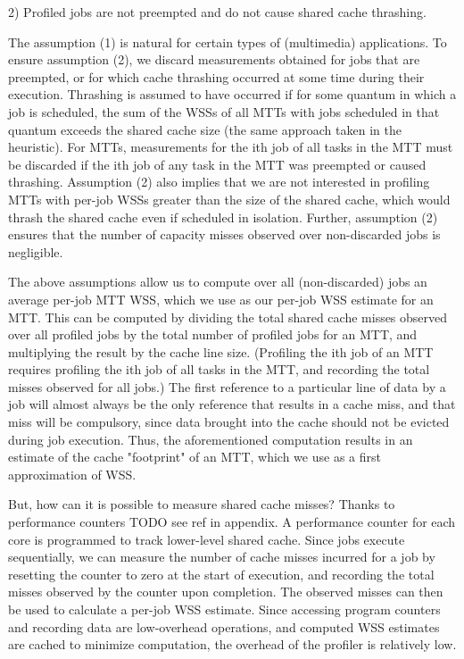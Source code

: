 \documentclass[a4paper,10pt]{article}
\begin{document}
\begin{multicols}{2}
2) Profiled jobs are not preempted and do not cause shared cache thrashing.

The assumption (1) is natural for certain types of (multimedia) applications. To ensure assumption (2), we discard measurements obtained for jobs that
are preempted, or for which cache thrashing occurred at some time during their execution. Thrashing is assumed to have occurred if for some
quantum in which a job is scheduled, the sum of the WSSs of all MTTs with jobs scheduled in that quantum exceeds the
shared cache size (the same approach taken in the heuristic). For MTTs, measurements for the ith job of all tasks in the
MTT must be discarded if the ith job of any task in the MTT was preempted or caused thrashing. Assumption (2) also implies that we are not interested
in profiling MTTs with per-job WSSs greater than the size of the shared cache, which would thrash the shared cache even if scheduled in isolation.
Further, assumption (2) ensures that the number of capacity misses observed over non-discarded jobs is negligible.

The above assumptions allow us to compute over all (non-discarded) jobs an average per-job MTT WSS, which we use as our per-job WSS estimate for
an MTT. This can be computed by dividing the total shared cache misses observed over all profiled jobs by the total number of profiled jobs for an MTT, 
and multiplying the result by the cache line size. (Profiling the ith job of an MTT requires profiling the ith job of all tasks in the MTT, and
recording the total misses observed for all jobs.) The first reference to a particular line of data by a job will almost always be the only reference
that results in a cache miss, and that miss will be compulsory, since data brought into the cache should not be evicted during job execution.
Thus, the aforementioned computation results in an estimate of the cache "footprint" of an MTT, which we use as a first approximation of WSS.

But, how can it is possible to measure shared cache misses? Thanks to performance counters TODO see ref in appendix.
A performance counter for each core is programmed to track lower-level shared cache. Since jobs execute sequentially, we can measure the number of
cache misses incurred for a job by resetting the counter to zero at the start of execution, and recording the total misses observed by the counter
upon completion. The observed misses can then be used to calculate a per-job WSS estimate. Since accessing program counters and recording data
are low-overhead operations, and computed WSS estimates are cached to minimize computation, the overhead of the profiler is relatively low.


\end{multicols}
\end{document}
